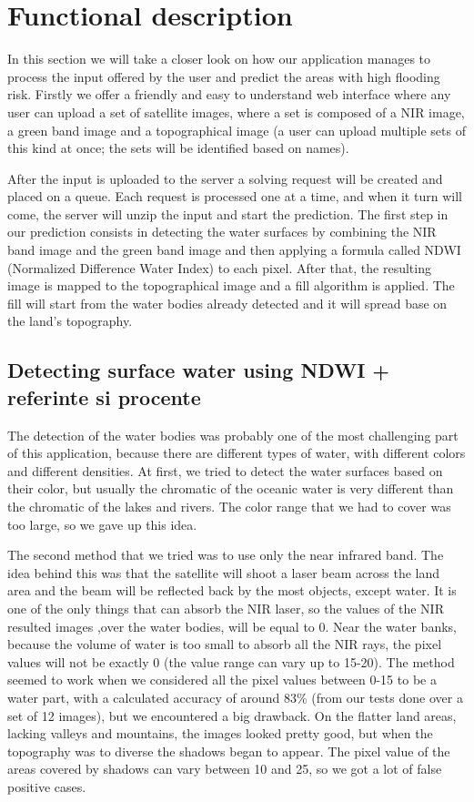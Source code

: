 \documentclass[12pt, a4paper]{report}
\begin{document}
\section{Functional description}

\quad
In this section we will take a closer look on how our application manages to process the input offered by the user and predict the areas with high flooding risk. Firstly we offer a friendly and easy to understand web interface where any user can upload a set of satellite images, where a set is composed of a NIR image, a green band image and a topographical image (a user can upload multiple sets of this kind at once; the sets will be identified based on names).
\par 
 After the input is uploaded to the server a solving request will be created and placed on a queue. Each request is processed one at a time, and when it turn will come, the server will unzip the input and start the prediction. The first step in our prediction consists in detecting the water surfaces by combining the NIR band image and the green band image and then applying a formula called NDWI (Normalized Difference Water Index) to each pixel. After that, the resulting image is mapped to the topographical image and a fill algorithm is applied. The fill will start from the water bodies already detected and it will spread base on the land's topography.


\subsection{Detecting surface water using NDWI + referinte si procente}
\quad 

The detection of the water bodies was probably one of the most challenging part of this application, because there are different types of water, with different colors and different densities. At first, we tried to detect the water surfaces based on their color, but usually the chromatic of the oceanic water is very different than the chromatic of the lakes and rivers. The color range that we had to cover was too large, so we gave up this idea. 
\par 
The second method that we tried was to use only the near infrared band. The idea behind this was that the satellite will shoot a laser beam across the land area and the beam will be reflected back by the most objects, except water. It is one of the only things that can absorb the NIR laser, so the values of the NIR resulted images ,over the water bodies, will be equal to 0. Near the water banks, because the volume of water is too small to absorb all the NIR rays, the pixel values will not be exactly 0 (the value range can vary up to 15-20). The method seemed to work when we considered all the pixel values between 0-15 to be a water part, with a calculated accuracy of around 83\% (from our tests done over a set of 12 images), but we encountered a big drawback. On the flatter land areas, lacking valleys and mountains, the images looked pretty good, but when the topography was to diverse the shadows began to appear. The pixel value of the areas covered by shadows can vary between 10 and 25, so we got a lot of false positive cases.
\end{document}

